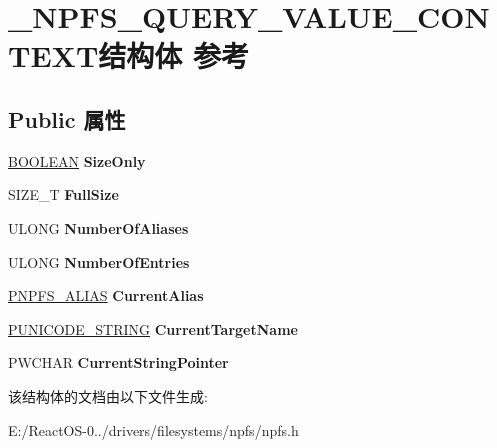\hypertarget{struct___n_p_f_s___q_u_e_r_y___v_a_l_u_e___c_o_n_t_e_x_t}{}\section{\+\_\+\+N\+P\+F\+S\+\_\+\+Q\+U\+E\+R\+Y\+\_\+\+V\+A\+L\+U\+E\+\_\+\+C\+O\+N\+T\+E\+X\+T结构体 参考}
\label{struct___n_p_f_s___q_u_e_r_y___v_a_l_u_e___c_o_n_t_e_x_t}
\subsection*{Public 属性}
\begin{DoxyCompactItemize}
\item 
\mbox{\label{struct___n_p_f_s___q_u_e_r_y___v_a_l_u_e___c_o_n_t_e_x_t_a8270945131f8b2ffe33f7a96a0311e44}} 
\hyperlink{_processor_bind_8h_a112e3146cb38b6ee95e64d85842e380a}{B\+O\+O\+L\+E\+AN} {\bfseries Size\+Only}
\item 
\mbox{\label{struct___n_p_f_s___q_u_e_r_y___v_a_l_u_e___c_o_n_t_e_x_t_a2c6d5036a340860c117d81304b83654c}} 
S\+I\+Z\+E\+\_\+T {\bfseries Full\+Size}
\item 
\mbox{\label{struct___n_p_f_s___q_u_e_r_y___v_a_l_u_e___c_o_n_t_e_x_t_a6c57c315206121413cccc376c8cf726c}} 
U\+L\+O\+NG {\bfseries Number\+Of\+Aliases}
\item 
\mbox{\label{struct___n_p_f_s___q_u_e_r_y___v_a_l_u_e___c_o_n_t_e_x_t_a76fadb1d2a364f306b446752c7fa18a7}} 
U\+L\+O\+NG {\bfseries Number\+Of\+Entries}
\item 
\mbox{\label{struct___n_p_f_s___q_u_e_r_y___v_a_l_u_e___c_o_n_t_e_x_t_ad64b890344e24e2786009166b647ef05}} 
\hyperlink{struct___n_p_f_s___a_l_i_a_s}{P\+N\+P\+F\+S\+\_\+\+A\+L\+I\+AS} {\bfseries Current\+Alias}
\item 
\mbox{\label{struct___n_p_f_s___q_u_e_r_y___v_a_l_u_e___c_o_n_t_e_x_t_a7b73d9de4538470d62108c85633d9ba0}} 
\hyperlink{struct___u_n_i_c_o_d_e___s_t_r_i_n_g}{P\+U\+N\+I\+C\+O\+D\+E\+\_\+\+S\+T\+R\+I\+NG} {\bfseries Current\+Target\+Name}
\item 
\mbox{\label{struct___n_p_f_s___q_u_e_r_y___v_a_l_u_e___c_o_n_t_e_x_t_adca947583c1fd0dac322d152b3bd867e}} 
P\+W\+C\+H\+AR {\bfseries Current\+String\+Pointer}
\end{DoxyCompactItemize}


该结构体的文档由以下文件生成\+:\begin{DoxyCompactItemize}
\item 
E\+:/\+React\+O\+S-\/0../drivers/filesystems/npfs/npfs.\+h\end{DoxyCompactItemize}
